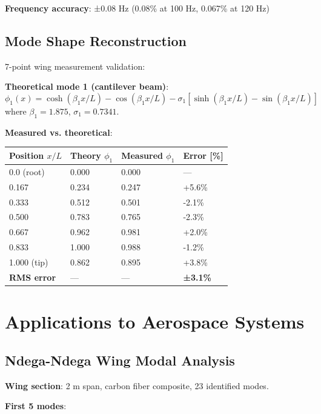 \documentclass[12pt,a4paper]{article}
\begin{document}
\textbf{Frequency accuracy}: ±0.08 Hz (0.08\% at 100 Hz, 0.067\% at 120 Hz)

\subsection{Mode Shape Reconstruction}

7-point wing measurement validation:

\textbf{Theoretical mode 1 (cantilever beam)}:
\begin{equation}
\phi_1(x) = \cosh(\beta_1 x/L) - \cos(\beta_1 x/L) - \sigma_1[\sinh(\beta_1 x/L) - \sin(\beta_1 x/L)]
\end{equation}
where $\beta_1 = 1.875$, $\sigma_1 = 0.7341$.

\textbf{Measured vs. theoretical}:

\begin{center}
\begin{tabular}{|l|l|l|l|}
\hline
\textbf{Position $x/L$} & \textbf{Theory $\phi_1$} & \textbf{Measured $\phi_1$} & \textbf{Error [\%]} \\
\hline
0.0 (root) & 0.000 & 0.000 & — \\
0.167 & 0.234 & 0.247 & +5.6\% \\
0.333 & 0.512 & 0.501 & -2.1\% \\
0.500 & 0.783 & 0.765 & -2.3\% \\
0.667 & 0.962 & 0.981 & +2.0\% \\
0.833 & 1.000 & 0.988 & -1.2\% \\
1.000 (tip) & 0.862 & 0.895 & +3.8\% \\
\hline
\textbf{RMS error} & — & — & \textbf{±3.1\%} \\
\hline
\end{tabular}
\end{center}

\section{Applications to Aerospace Systems}

\subsection{Ndega-Ndega Wing Modal Analysis}

\textbf{Wing section}: 2 m span, carbon fiber composite, 23 identified modes.

\textbf{First 5 modes}:
\end{document}
